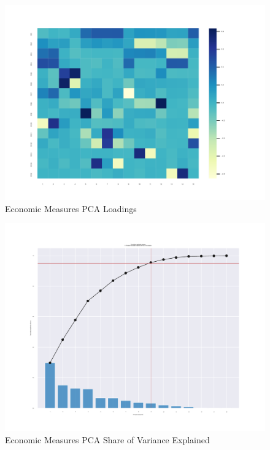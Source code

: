 \documentclass[12pt]{article}
\begin{document}
        \begin{figure}[h!]
            \centering
            \caption{Economic Measures PCA Loadings}
            \label{Econ_Loadings}	
            \includegraphics[width=\linewidth,keepaspectratio=true]{../Output/Figures/Econ_Indicator_Loadings.pdf}
        \end{figure}

        \begin{figure}[h!]
            \centering
            \caption{Economic Measures PCA Share of Variance Explained}
            \label{Econ_Share_Explained}	
            \includegraphics[width=\linewidth,keepaspectratio=true]{../Output/Figures/Econ_Indicator_Share_Explained.pdf}
        \end{figure}
\end{document}
